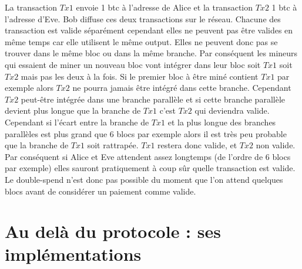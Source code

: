 \documentclass[11pt,a4paper]{article}
\begin{document}
La transaction $Tx1$ envoie 1 btc à l'adresse de Alice et la transaction $Tx2$ 1 btc à l'adresse d'Eve. Bob diffuse ces deux transactions sur le réseau. Chacune des transaction est valide séparément cependant elles ne peuvent pas être valides en même temps car elle utilisent le même output. Elles ne peuvent donc pas se trouver dans le même bloc ou dans la même branche. Par conséquent les mineurs qui essaient de miner un nouveau bloc vont intégrer dans leur bloc soit $Tx1$ soit $Tx2$ mais pas les deux à la fois. Si le premier bloc à être miné contient $Tx1$ par exemple alors $Tx2$ ne pourra jamais être intégré dans cette branche. Cependant $Tx2$ peut-être intégrée dans une branche parallèle et si cette branche parallèle devient plus longue que la branche de $Tx1$ c'est $Tx2$ qui deviendra valide. Cependant si l'écart entre la branche de $Tx1$ et la plus longue des branches parallèles est plus grand que 6 blocs par exemple alors il est très peu probable que la branche de $Tx1$ soit rattrapée. $Tx1$ restera donc valide, et $Tx2$ non valide. Par conséquent si Alice et Eve attendent assez longtemps (de l'ordre de 6 blocs par exemple) elles sauront pratiquement à coup sûr quelle transaction est valide. Le double-spend n'est donc pas possible du moment que l'on attend quelques blocs avant de considérer un paiement comme valide.

\section{Au delà du protocole : ses implémentations}
\end{document}
